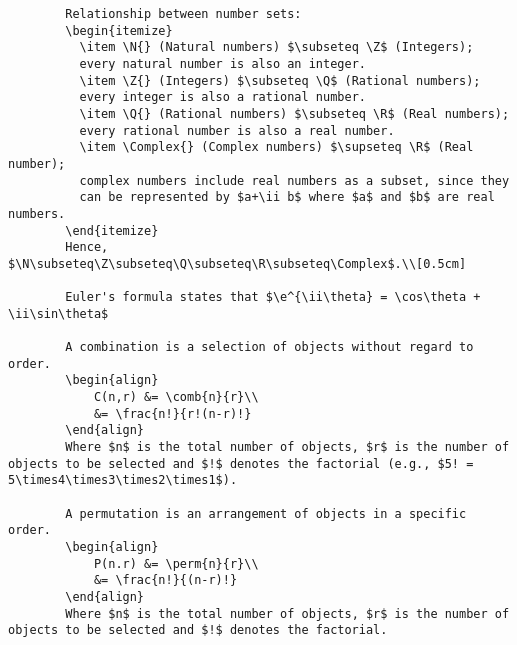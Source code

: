 \documentclass[a4paper,11pt,twoside]{article}
\begin{document}
\begin{verbatim}
        Relationship between number sets:
        \begin{itemize}
          \item \N{} (Natural numbers) $\subseteq \Z$ (Integers);
          every natural number is also an integer.
          \item \Z{} (Integers) $\subseteq \Q$ (Rational numbers);
          every integer is also a rational number.
          \item \Q{} (Rational numbers) $\subseteq \R$ (Real numbers);
          every rational number is also a real number.
          \item \Complex{} (Complex numbers) $\supseteq \R$ (Real number);
          complex numbers include real numbers as a subset, since they
          can be represented by $a+\ii b$ where $a$ and $b$ are real numbers.
        \end{itemize}
        Hence, $\N\subseteq\Z\subseteq\Q\subseteq\R\subseteq\Complex$.\\[0.5cm]
        
        Euler's formula states that $\e^{\ii\theta} = \cos\theta + \ii\sin\theta$
        
        A combination is a selection of objects without regard to order.
        \begin{align}
        	C(n,r) &= \comb{n}{r}\\
        	&= \frac{n!}{r!(n-r)!}
        \end{align}
        Where $n$ is the total number of objects, $r$ is the number of objects to be selected and $!$ denotes the factorial (e.g., $5! = 5\times4\times3\times2\times1$).
        
        A permutation is an arrangement of objects in a specific order.
        \begin{align}
        	P(n.r) &= \perm{n}{r}\\
        	&= \frac{n!}{(n-r)!}
        \end{align}
        Where $n$ is the total number of objects, $r$ is the number of objects to be selected and $!$ denotes the factorial.
\end{verbatim}
\end{document}
